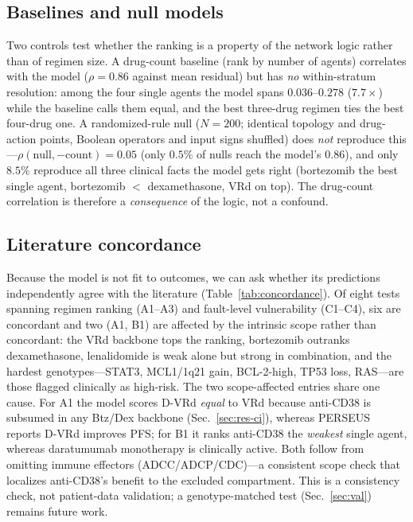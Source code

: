 \documentclass[conference,letterpaper]{IEEEtran}
\begin{document}
\subsection{Baselines and null models}\label{sec:res-baseline}
Two controls test whether the ranking is a property of the network logic rather
than of regimen size. A drug-count baseline (rank by number of agents) correlates
with the model ($\rho=0.86$ against mean residual) but has \emph{no} within-stratum
resolution: among the four single agents the model spans $0.036$--$0.278$
($7.7\times$) while the baseline calls them equal, and the best three-drug regimen
ties the best four-drug one. A randomized-rule null ($N{=}200$; identical topology
and drug-action points, Boolean operators and input signs shuffled) does
\emph{not} reproduce this---$\rho(\text{null},-\text{count})=0.05$ (only $0.5\%$ of
nulls reach the model's $0.86$), and only $8.5\%$ reproduce all three clinical
facts the model gets right (bortezomib the best single agent, bortezomib $<$
dexamethasone, VRd on top). The drug-count correlation is therefore a
\emph{consequence} of the logic, not a confound.

\subsection{Literature concordance}\label{sec:res-novel}
Because the model is not fit to outcomes, we can ask whether its predictions
independently agree with the literature (Table~\ref{tab:concordance}). Of eight
tests spanning regimen ranking (A1--A3) and fault-level vulnerability (C1--C4),
six are concordant and two (A1, B1) are affected by the intrinsic scope rather
than concordant: the VRd backbone tops the ranking, bortezomib outranks dexamethasone, lenalidomide is weak alone but strong
in combination, and the hardest genotypes---STAT3, MCL1/1q21 gain, BCL-2-high,
TP53 loss, RAS---are those flagged clinically as high-risk. The two scope-affected entries share one cause. For A1 the model
scores D-VRd \emph{equal} to VRd because anti-CD38 is subsumed in any Btz/Dex
backbone (Sec.~\ref{sec:res-ci}), whereas PERSEUS reports D-VRd improves PFS; for
B1 it ranks anti-CD38 the \emph{weakest} single agent, whereas daratumumab
monotherapy is clinically active. Both follow from omitting immune effectors
(ADCC/ADCP/CDC)---a consistent scope check that localizes anti-CD38's benefit to
the excluded compartment. This is a consistency
check, not patient-data validation; a genotype-matched test
(Sec.~\ref{sec:val}) remains future work.
\end{document}
